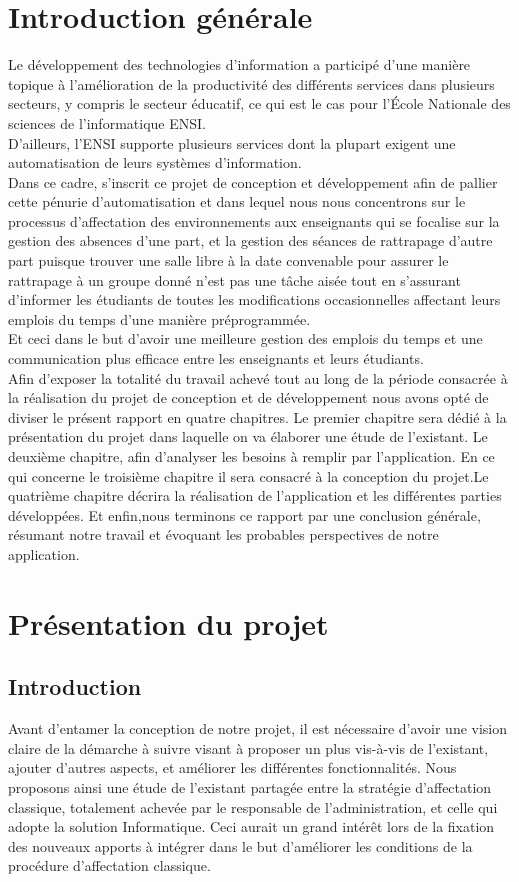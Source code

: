 \documentclass[a4paper,12pt,oneside]{report}
\begin{document}
\chapter*{Introduction générale}
Le développement des technologies d'information a participé d'une manière topique à l'amélioration de la productivité des différents services dans plusieurs secteurs, y compris le secteur éducatif,
ce qui est le cas pour l'École Nationale des sciences de l'informatique ENSI.\\
D'ailleurs, l'ENSI supporte plusieurs services dont la plupart exigent une automatisation de leurs systèmes d'information. \\ Dans ce cadre, s'inscrit ce projet de conception et développement afin de  pallier cette pénurie d'automatisation et dans lequel nous nous concentrons   sur le processus d'affectation des environnements aux enseignants qui se focalise sur la gestion des absences d'une part, et la gestion des séances de rattrapage d'autre part puisque  trouver une salle libre à la date convenable pour assurer le rattrapage à un groupe donné  n'est pas une tâche aisée tout en s'assurant d'informer les étudiants de toutes les modifications occasionnelles affectant  leurs emplois du temps d'une manière préprogrammée.  \\
Et ceci dans le but d'avoir une meilleure gestion des emplois du temps et une communication plus efficace entre les enseignants et leurs étudiants.\\


Afin d'exposer la totalité du travail achevé tout au long de la période consacrée à la réalisation du projet de conception et de développement  nous avons opté de diviser le présent rapport en quatre chapitres. Le premier chapitre sera dédié à la présentation du projet dans laquelle on va élaborer une étude de l'existant. Le deuxième chapitre, afin d'analyser les besoins à remplir par l'application. En ce qui concerne le troisième chapitre il sera consacré à la conception du projet.Le quatrième chapitre décrira la réalisation de l'application et les différentes parties développées. Et enfin,nous terminons ce rapport par une conclusion  générale, résumant notre travail et évoquant les probables perspectives de notre application. 

\chapter{Présentation du projet}
         \section{Introduction}
         Avant d'entamer la conception de notre projet, il est nécessaire d'avoir une vision claire de  la démarche à suivre visant à proposer un plus vis-à-vis  de l'existant, ajouter d'autres aspects, et améliorer les différentes fonctionnalités. Nous proposons ainsi une étude de l'existant partagée entre la stratégie d'affectation classique, totalement achevée par le responsable de l'administration, et celle qui adopte la solution Informatique. Ceci aurait un grand intérêt lors de la fixation des nouveaux apports à intégrer dans le but d'améliorer les conditions de la procédure d'affectation classique.
\end{document}
